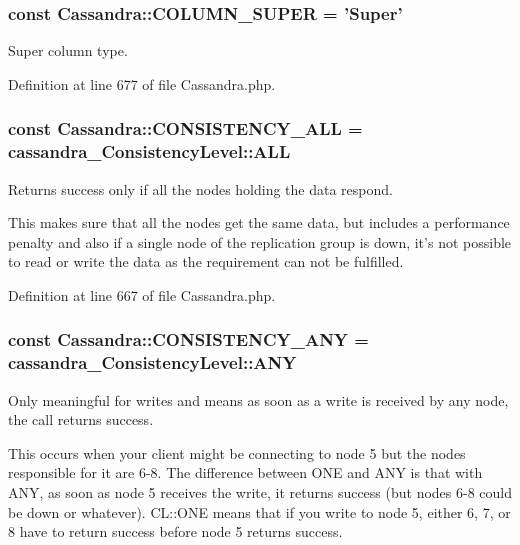 \hypertarget{classCassandra_abf8e49b590d1e1b83d3e13cc133cd672}{
\subsubsection[{COLUMN\_\-SUPER}]{\setlength{\rightskip}{0pt plus 5cm}const {\bf Cassandra::COLUMN\_\-SUPER} = 'Super'}}
\label{classCassandra_abf8e49b590d1e1b83d3e13cc133cd672}
Super column type. 

Definition at line 677 of file Cassandra.php.

\hypertarget{classCassandra_ac7e4763d615ce200970153894d53219a}{
\subsubsection[{CONSISTENCY\_\-ALL}]{\setlength{\rightskip}{0pt plus 5cm}const {\bf Cassandra::CONSISTENCY\_\-ALL} = cassandra\_\-ConsistencyLevel::ALL}}
\label{classCassandra_ac7e4763d615ce200970153894d53219a}
Returns success only if all the nodes holding the data respond.

This makes sure that all the nodes get the same data, but includes a performance penalty and also if a single node of the replication group is down, it's not possible to read or write the data as the requirement can not be fulfilled. 

Definition at line 667 of file Cassandra.php.

\hypertarget{classCassandra_a94fdd09de0798393d86a9965482cefa7}{
\subsubsection[{CONSISTENCY\_\-ANY}]{\setlength{\rightskip}{0pt plus 5cm}const {\bf Cassandra::CONSISTENCY\_\-ANY} = cassandra\_\-ConsistencyLevel::ANY}}
\label{classCassandra_a94fdd09de0798393d86a9965482cefa7}
Only meaningful for writes and means as soon as a write is received by any node, the call returns success.

This occurs when your client might be connecting to node 5 but the nodes responsible for it are 6-\/8. The difference between ONE and ANY is that with ANY, as soon as node 5 receives the write, it returns success (but nodes 6-\/8 could be down or whatever). CL::ONE means that if you write to node 5, either 6, 7, or 8 have to return success before node 5 returns success. 

